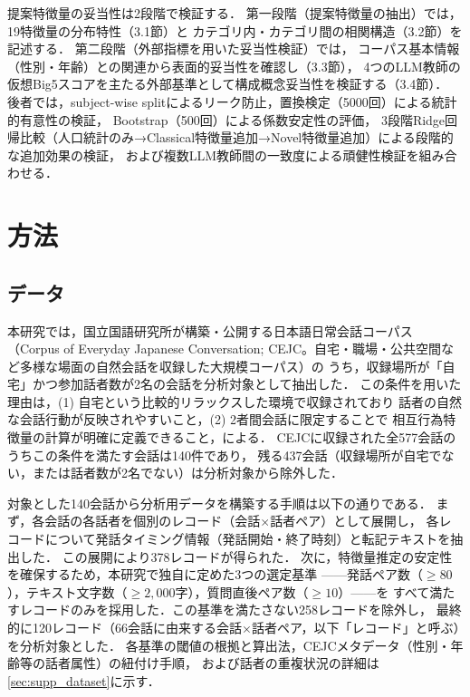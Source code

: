 \documentclass[dvipdfmx,11pt,a4paper]{bxjsarticle}
\renewcommand{\_}{\paperorigunderscore\allowbreak}%
\begin{document}
提案特徴量の妥当性は2段階で検証する．
第一段階（提案特徴量の抽出）では，19特徴量の分布特性（3.1節）と
カテゴリ内・カテゴリ間の相関構造（3.2節）を記述する．
第二段階（外部指標を用いた妥当性検証）では，
コーパス基本情報（性別・年齢）との関連から表面的妥当性を確認し（3.3節），
4つのLLM教師の仮想Big5スコアを主たる外部基準として構成概念妥当性を検証する（3.4節）．
後者では，subject-wise splitによるリーク防止，置換検定（5000回）による統計的有意性の検証，
Bootstrap（500回）による係数安定性の評価，
3段階Ridge回帰比較（人口統計のみ→Classical特徴量追加→Novel特徴量追加）による段階的な追加効果の検証，
および複数LLM教師間の一致度による頑健性検証を組み合わせる．

\section{方法}

\subsection{データ}
\label{sec:data}

本研究では，国立国語研究所が構築・公開する日本語日常会話コーパス
（Corpus of Everyday Japanese Conversation; CEJC。自宅・職場・公共空間など多様な場面の自然会話を収録した大規模コーパス）の
うち，収録場所が「自宅」かつ参加話者数が2名の会話を分析対象として抽出した．
この条件を用いた理由は，(1) 自宅という比較的リラックスした環境で収録されており
話者の自然な会話行動が反映されやすいこと，(2) 2者間会話に限定することで
相互行為特徴量の計算が明確に定義できること，による．
CEJCに収録された全577会話のうちこの条件を満たす会話は140件であり，
残る437会話（収録場所が自宅でない，または話者数が2名でない）は分析対象から除外した．

対象とした140会話から分析用データを構築する手順は以下の通りである．
まず，各会話の各話者を個別のレコード（会話$\times$話者ペア）として展開し，
各レコードについて発話タイミング情報（発話開始・終了時刻）と転記テキストを抽出した．
この展開により378レコードが得られた．
次に，特徴量推定の安定性を確保するため，本研究で独自に定めた3つの選定基準
——発話ペア数（$\geq 80$），テキスト文字数（$\geq 2{,}000$字），質問直後ペア数（$\geq 10$）——を
すべて満たすレコードのみを採用した．この基準を満たさない258レコードを除外し，
最終的に120レコード（66会話に由来する会話$\times$話者ペア，以下「レコード」と呼ぶ）を分析対象とした．
各基準の閾値の根拠と算出法，CEJCメタデータ（性別・年齢等の話者属性）の紐付け手順，
および話者の重複状況の詳細は\ref{sec:supp_dataset}に示す．
\end{document}
